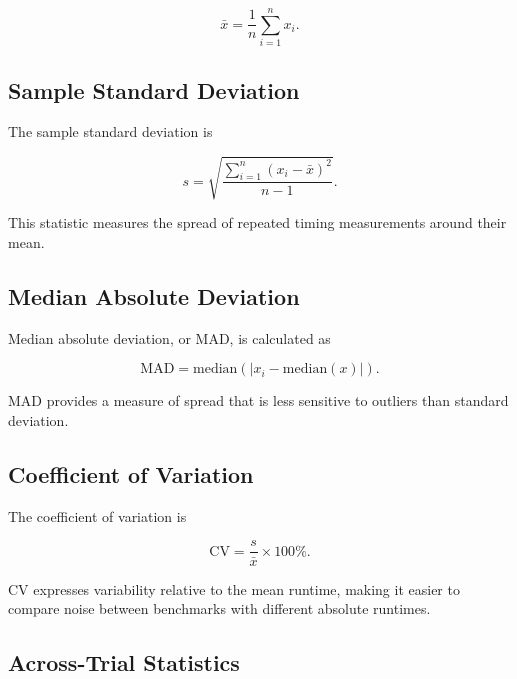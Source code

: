 \documentclass[11pt]{article}
\begin{document}
\begin{equation}
    \bar{x}
    =
    \frac{1}{n}
    \sum_{i=1}^{n} x_i.
    \label{eq:mean}
\end{equation}


\subsection{Sample Standard Deviation}

The sample standard deviation is

\begin{equation}
    s
    =
    \sqrt{
        \frac{
            \sum_{i=1}^{n}
            \left(x_i - \bar{x}\right)^2
        }{
            n - 1
        }
    }.
    \label{eq:stdev}
\end{equation}

This statistic measures the spread of repeated timing
measurements around their mean.


\subsection{Median Absolute Deviation}

Median absolute deviation, or MAD, is calculated as

\begin{equation}
    \mathrm{MAD}
    =
    \mathrm{median}
    \left(
        \left|
            x_i - \mathrm{median}(x)
        \right|
    \right).
    \label{eq:mad}
\end{equation}

MAD provides a measure of spread that is less sensitive to
outliers than standard deviation.


\subsection{Coefficient of Variation}

The coefficient of variation is

\begin{equation}
    \mathrm{CV}
    =
    \frac{s}{\bar{x}}
    \times 100\%.
    \label{eq:cv}
\end{equation}

CV expresses variability relative to the mean runtime, making it
easier to compare noise between benchmarks with different
absolute runtimes.


\subsection{Across-Trial Statistics}
\end{document}
